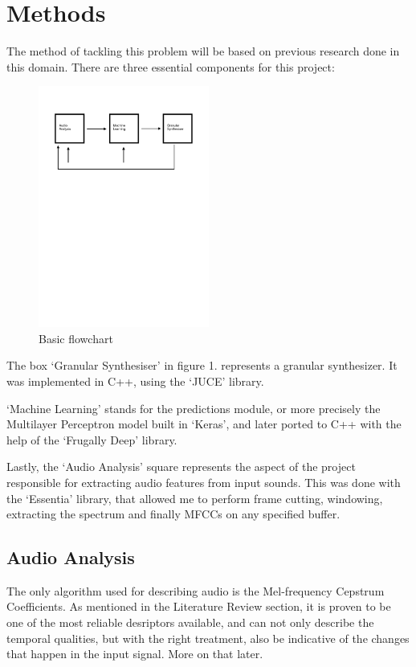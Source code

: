 \chapter{Methods}

The method of tackling this problem will be based on previous research done in this domain. There are three essential components for this project:
\begin{figure}[h]
\caption{Basic flowchart}
\centering
\includegraphics[width=0.5\textwidth]{images/flowchart}
\end{figure}

The box `Granular Synthesiser' in figure 1. represents a granular synthesizer.
It was implemented in C++, using the `JUCE' library.

`Machine Learning' stands for the predictions module, or more
precisely the Multilayer Perceptron model built in `Keras', and later
ported to C++ with the help of the `Frugally Deep' library.

Lastly, the `Audio Analysis' square represents the aspect of the
project responsible for extracting audio features from input
sounds. This was done with the `Essentia' library, that allowed me to
perform frame cutting, windowing, extracting the spectrum and finally
MFCCs on any specified buffer.

\section{Audio Analysis}

The only algorithm used for describing audio is the Mel-frequency
Cepstrum Coefficients. As mentioned in the Literature Review section,
it is proven to be one of the most reliable desriptors available, and
can not only describe the temporal qualities, but with the right
treatment, also be indicative of the changes that happen in the input
signal. More on that later.

